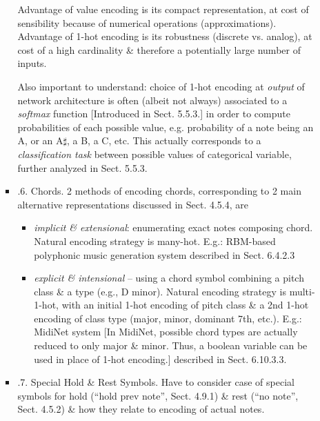 \documentclass{article}
\begin{document}
\begin{itemize}
\begin{itemize}
\begin{itemize}
			Advantage of value encoding is its compact representation, at cost of sensibility because of numerical operations (approximations). Advantage of 1-hot encoding is its robustness (discrete vs. analog), at cost of a high cardinality \& therefore a potentially large number of inputs.

			Also important to understand: choice of 1-hot encoding at {\it output} of network architecture is often (albeit not always) associated to a {\it softmax} function [Introduced in Sect. 5.5.3.] in order to compute probabilities of each possible value, e.g. probability of a note being an A, or an A$\sharp$, a B, a C, etc. This actually corresponds to a {\it classification task} between possible values of categorical variable, further analyzed in Sect. 5.5.3.
			\item {.6. Chords.} 2 methods of encoding chords, corresponding to 2 main alternative representations discussed in Sect. 4.5.4, are
			\begin{itemize}
				\item {\it implicit \& extensional}: enumerating exact notes composing chord. Natural encoding strategy is many-hot. E.g.: RBM-based polyphonic music generation system described in Sect. 6.4.2.3
				\item {\it explicit \& intensional} -- using a chord symbol combining a pitch class \& a type (e.g., D minor). Natural encoding strategy is multi-1-hot, with an initial 1-hot encoding of pitch class \& a 2nd 1-hot encoding of class type (major, minor, dominant 7th, etc.). E.g.: MidiNet system [In MidiNet, possible chord types are actually reduced to only major \& minor. Thus, a boolean variable can be used in place of 1-hot encoding.] described in Sect. 6.10.3.3.
			\end{itemize}
			\item {.7. Special Hold \& Rest Symbols.} Have to consider case of special symbols for hold (``hold prev note'', Sect. 4.9.1) \& rest (``no note'', Sect. 4.5.2) \& how they relate to encoding of actual notes.


\end{itemize}
\end{itemize}
\end{itemize}
\end{document}
